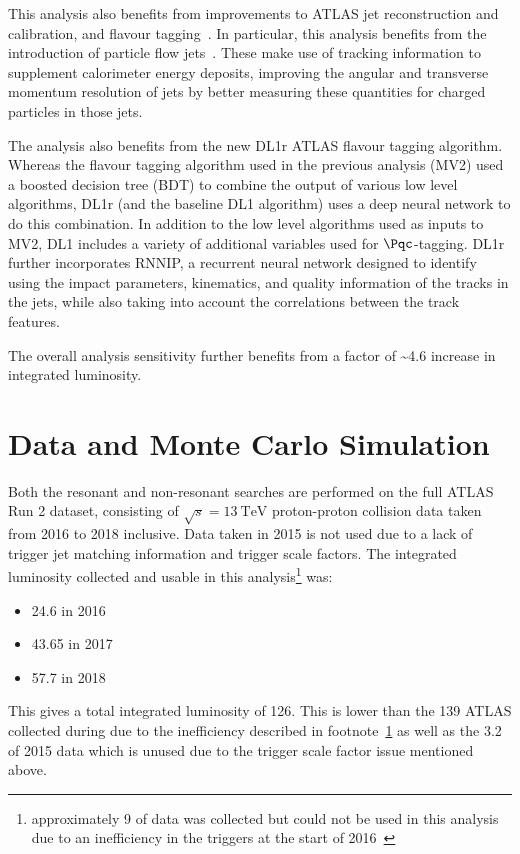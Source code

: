This analysis also benefits from improvements to ATLAS jet reconstruction and
calibration, and flavour tagging~\cite{FTAG-2018-01}. In particular, this
analysis benefits from the introduction of particle flow
jets~\cite{PERF-2015-09}. These make use of tracking information to supplement
calorimeter energy deposits, improving the angular and transverse momentum
resolution of jets by better measuring these quantities for charged particles in
those jets.

The analysis also benefits from the new DL1r ATLAS flavour tagging algorithm.
Whereas the flavour tagging algorithm used in the previous analysis (MV2) used a
boosted decision tree (BDT) to combine the output of various low level
algorithms, DL1r (and the baseline DL1 algorithm) uses a deep neural network to
do this combination. In addition to the low level algorithms used as inputs to
MV2, DL1 includes a variety of additional variables used for $\Pqc$-tagging. DL1r
further incorporates RNNIP, a recurrent neural network designed
to identify \bjets using the impact parameters, kinematics, and quality
information of the tracks in the jets, while also taking into account the
correlations between the track features.

The overall analysis sensitivity further benefits from a factor of
\textasciitilde 4.6 increase in integrated luminosity.

\section{Data and Monte Carlo Simulation}
Both the resonant and non-resonant searches are performed on the full ATLAS Run 2 dataset, consisting of 
$\sqrt{s} = \SI{13}{\TeV}$ proton-proton collision data taken from 2016 to 2018 inclusive. Data taken in 2015 
is not used due to a lack of trigger jet matching
information and \bjet trigger scale factors. The integrated luminosity collected
and usable in this analysis\footnote{\label{foot:lost-lumi}approximately
  \SI{9}{\ifb} of data was collected but could not be used in this analysis due
  to an inefficiency in the \bjet triggers at the start of 2016~\cite{ATL-COM-DAQ-2019-150}} was:
\begin{itemize}
  \item \SI{24.6}{\ifb} in 2016
  \item \SI{43.65}{\ifb} in 2017
  \item \SI{57.7}{\ifb} in 2018
\end{itemize}

This gives a total integrated luminosity of \SI{126}{\ifb}.
This is lower than the \SI{139}{\ifb} ATLAS collected during \RunTwo
\cite{ATLAS-CONF-2019-021} due to the inefficiency described in
footnote~\ref{foot:lost-lumi} as well as the \SI{3.2}{\ifb} 
of 2015 data which is unused due to the trigger scale factor 
issue mentioned above.

